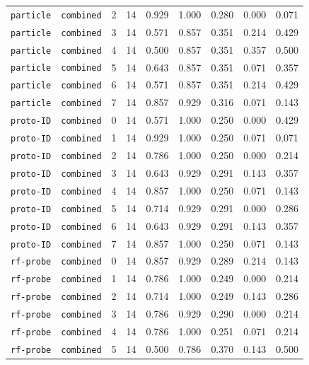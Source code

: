 \documentclass{article}
\begin{document}
\begin{center}
{\begin{tabular}{llllccccc}
\texttt{particle} & \texttt{combined} & 2 & 14 & 0.929 & 1.000 & 0.280 & 0.000 & 0.071 \\
\texttt{particle} & \texttt{combined} & 3 & 14 & 0.571 & 0.857 & 0.351 & 0.214 & 0.429 \\
\texttt{particle} & \texttt{combined} & 4 & 14 & 0.500 & 0.857 & 0.351 & 0.357 & 0.500 \\
\texttt{particle} & \texttt{combined} & 5 & 14 & 0.643 & 0.857 & 0.351 & 0.071 & 0.357 \\
\texttt{particle} & \texttt{combined} & 6 & 14 & 0.571 & 0.857 & 0.351 & 0.214 & 0.429 \\
\texttt{particle} & \texttt{combined} & 7 & 14 & 0.857 & 0.929 & 0.316 & 0.071 & 0.143 \\
\texttt{proto-ID} & \texttt{combined} & 0 & 14 & 0.571 & 1.000 & 0.250 & 0.000 & 0.429 \\
\texttt{proto-ID} & \texttt{combined} & 1 & 14 & 0.929 & 1.000 & 0.250 & 0.071 & 0.071 \\
\texttt{proto-ID} & \texttt{combined} & 2 & 14 & 0.786 & 1.000 & 0.250 & 0.000 & 0.214 \\
\texttt{proto-ID} & \texttt{combined} & 3 & 14 & 0.643 & 0.929 & 0.291 & 0.143 & 0.357 \\
\texttt{proto-ID} & \texttt{combined} & 4 & 14 & 0.857 & 1.000 & 0.250 & 0.071 & 0.143 \\
\texttt{proto-ID} & \texttt{combined} & 5 & 14 & 0.714 & 0.929 & 0.291 & 0.000 & 0.286 \\
\texttt{proto-ID} & \texttt{combined} & 6 & 14 & 0.643 & 0.929 & 0.291 & 0.143 & 0.357 \\
\texttt{proto-ID} & \texttt{combined} & 7 & 14 & 0.857 & 1.000 & 0.250 & 0.071 & 0.143 \\
\texttt{rf-probe} & \texttt{combined} & 0 & 14 & 0.857 & 0.929 & 0.289 & 0.214 & 0.143 \\
\texttt{rf-probe} & \texttt{combined} & 1 & 14 & 0.786 & 1.000 & 0.249 & 0.000 & 0.214 \\
\texttt{rf-probe} & \texttt{combined} & 2 & 14 & 0.714 & 1.000 & 0.249 & 0.143 & 0.286 \\
\texttt{rf-probe} & \texttt{combined} & 3 & 14 & 0.786 & 0.929 & 0.290 & 0.000 & 0.214 \\
\texttt{rf-probe} & \texttt{combined} & 4 & 14 & 0.786 & 1.000 & 0.251 & 0.071 & 0.214 \\
\texttt{rf-probe} & \texttt{combined} & 5 & 14 & 0.500 & 0.786 & 0.370 & 0.143 & 0.500 \\
\bottomrule
\end{tabular}%
}
\end{center}
\end{document}
